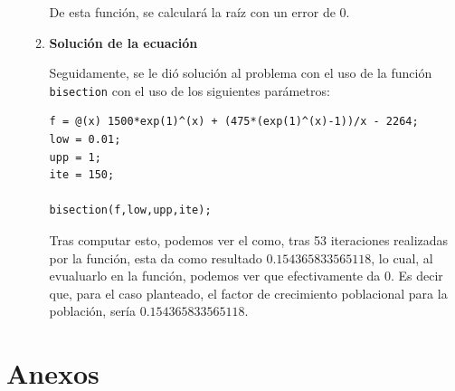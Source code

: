 \documentclass[english,notitlepage,letterpaper, 10pt]{article} %
\begin{document}
\begin{enumerate}
\begin{enumerate}
      De esta función, se calculará la raíz con un error de 0.

      \item \textbf{Solución de la ecuación}

      Seguidamente, se le dió solución al problema con el uso de la función \texttt{bisection} con el uso de los siguientes parámetros:

      \begin{lstlisting}
f = @(x) 1500*exp(1)^(x) + (475*(exp(1)^(x)-1))/x - 2264;
low = 0.01;
upp = 1;
ite = 150;

bisection(f,low,upp,ite);
      \end{lstlisting}

      Tras computar esto, podemos ver el como, tras 53 iteraciones realizadas por la función, esta da como resultado $0.154365833565118$, lo cual, al evualuarlo en la función, podemos ver que efectivamente da $0$. Es decir que, para el caso planteado, el factor de crecimiento poblacional para la población, sería $0.154365833565118$.

    \end{enumerate}

  \end{enumerate}         

  
  


\section{Anexos}
\end{document}
